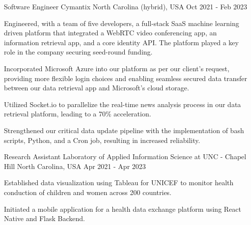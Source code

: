 \begin{cventries}
    \cventry
    {Software Engineer} %
    {Cymantix} %
    {North Carolina (hybrid), USA} %
    {Oct 2021 - Feb 2023} %
    {
      \begin{cvitems} %
        \item {Engineered, with a team of five developers,  a full-stack SaaS machine learning driven platform that integrated a WebRTC video conferencing app, an information retrieval app, and a core identity API. The platform played a key role in the company securing seed-round funding.}
        \item {Incorporated Microsoft Azure into our platform as per our client's request, providing more flexible login choices and enabling seamless secured data transfer between our data retrieval app and Microsoft's cloud storage.}
        \item {Utilized Socket.io to parallelize the real-time news analysis process in our data retrieval platform, leading to a 70\% acceleration.}
        \item {Strengthened our critical data update pipeline with the implementation of bash scripts, Python, and a Cron job, resulting in increased reliability.}
      \end{cvitems}
    }

    \cventry
    {Research Assistant} %
    {Laboratory of Applied Information Science at UNC - Chapel Hill} %
    {North Carolina, USA} %
    {Apr 2021 - Apr 2023} %
    {
      \begin{cvitems} %
        \item {Established data visualization using Tableau for UNICEF to monitor health conduction of children and women across 200 countries.}
        \item {Initiated a mobile application for a health data exchange platform using React Native and Flask Backend.}
      \end{cvitems}
    }


\end{cventries}

